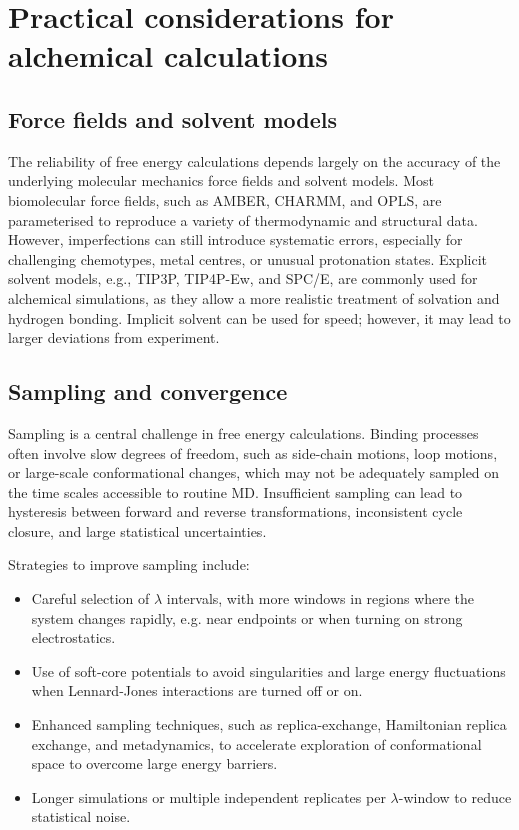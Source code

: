 \documentclass[12pt]{article}
\begin{document}
\section{Practical considerations for alchemical calculations}

\subsection{Force fields and solvent models}

The reliability of free energy calculations depends largely on the accuracy of the underlying molecular mechanics force fields and solvent models. Most biomolecular force fields, such as  AMBER, CHARMM, and OPLS, are parameterised to reproduce a variety of thermodynamic and structural data. However, imperfections can still introduce systematic errors, especially for challenging chemotypes, metal centres, or unusual protonation states\cite{CH10_wang2004amber}. Explicit solvent models, e.g., TIP3P, TIP4P-Ew, and SPC/E, are commonly used for alchemical simulations, as they allow a more realistic treatment of solvation and hydrogen bonding. Implicit solvent can be used for speed; however, it may lead to larger deviations from experiment. 

\subsection{Sampling and convergence}

Sampling is a central challenge in free energy calculations. Binding processes often involve slow degrees of freedom, such as side-chain motions, loop motions, or large-scale conformational changes, which may not be adequately sampled on the time scales accessible to routine MD. Insufficient sampling can lead to hysteresis between forward and reverse transformations, inconsistent cycle closure, and large statistical uncertainties\cite{CH10_aldeghi2018accurate}. 

Strategies to improve sampling include:
\begin{itemize}
  \item Careful selection of $\lambda$ intervals, with more windows in regions where the system changes rapidly, e.g. near endpoints or when turning on strong electrostatics.
  \item Use of soft-core potentials to avoid singularities and large energy fluctuations when Lennard-Jones interactions are turned off or on.
  \item Enhanced sampling techniques, such as replica-exchange, Hamiltonian replica exchange, and metadynamics, to accelerate exploration of conformational space to overcome large energy barriers.
  \item Longer simulations or multiple independent replicates per $\lambda$-window to reduce statistical noise.
\end{itemize}
\end{document}
